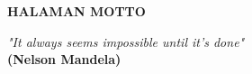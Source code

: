 \clearpage
{}
{}

\begin{center}
	\textbf{\large HALAMAN MOTTO}\\[5em]
\end{center}

\begin{center}
    \textit{"It always seems impossible until it’s done"} \\
    \textbf{(Nelson Mandela)} \\[1cm]
\end{center} 